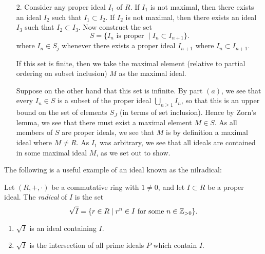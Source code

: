 \begin{prf}
\begin{itemize}
            \item[2.] Consider any proper ideal $I_1$ of $R$. If $I_1$ is not maximal,
            then there exists an ideal $I_2$ such that $I_1 \subset I_2$. If
            $I_2$ is not maximal, then there exists an ideal $I_3$ such
            that $I_2 \subset I_3$.
            Now construct the set 
            \[
                S = \{I_n \text{ is proper } \mid I_{n} \subset I_{n+1}\}.
            \]
            where $I_n \in S_j$ whenever there exists a proper ideal
            $I_{n+1}$ where $I_n \subset I_{n+1}$.
            
            If this set is finite, then we take the maximal element
            (relative to partial ordering on subset inclusion) $M$ as the
            maximal ideal. 
    
            Suppose on the other hand that this set is infinite. 
            By part
            $(a)$, we see that every $I_n \in S$ is a subset of the proper
            ideal $\bigcup_{n \ge 1} I_n$, so that this is an upper bound
            on the set of elements $S_J$ (in terms of set inclusion).
            Hence by Zorn's lemma, we see that there must exist a maximal
            element $M \in S$. As all members of $S$ are proper ideals, we
            see that $M$ is by definition a maximal ideal where $M \ne R$.
            As $I_1$ was arbitrary, we see that all ideals are contained in
            some maximal ideal $M$, as we set out to show.
        \end{itemize}
    \end{prf}

    The following is a useful example of an ideal known as the
    nilradical:
    \begin{proposition}
        Let $(R, +, \cdot)$ be a commutative ring with $1 \ne 0$, and let
    $I \subset R$ be a proper ideal. The 
    \textit{radical} of $I$ is the set 
    \[
        \sqrt{I} = \{r \in R \mid r^n \in I \text{ for some } n \in \mathbb{Z}_{> 0}  \}.
    \]
    \begin{enumerate}
        \item $\sqrt{I}$ is an ideal containing $I$. 
        
        \item $\sqrt{I}$ is the intersection of all prime
        ideals $P$ which contain $I$.
    \end{enumerate}
    \end{proposition}

